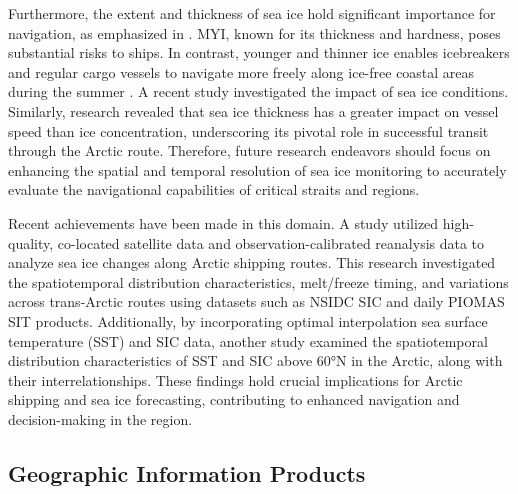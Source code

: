 Furthermore, the extent and thickness of sea ice hold significant importance for navigation, as emphasized in \cite{172buixade2014commercial}. MYI, known for its thickness and hardness, poses substantial risks to ships. In contrast, younger and thinner ice enables icebreakers and regular cargo vessels to navigate more freely along ice-free coastal areas during the summer \cite{175zhou2021revisiting}. A recent study \cite{177wang2021feasibility} investigated the impact of sea ice conditions. Similarly, research \cite{170shi2022navigability} revealed that sea ice thickness has a greater impact on vessel speed than ice concentration, underscoring its pivotal role in successful transit through the Arctic route. Therefore, future research endeavors should focus on enhancing the spatial and temporal resolution of sea ice monitoring to accurately evaluate the navigational capabilities of critical straits and regions.

Recent achievements have been made in this domain. A study \cite{173cao2022trans} utilized high-quality, co-located satellite data and observation-calibrated reanalysis data to analyze sea ice changes along Arctic shipping routes. This research investigated the spatiotemporal distribution characteristics, melt/freeze timing, and variations across trans-Arctic routes using datasets such as NSIDC SIC and daily PIOMAS SIT products. Additionally, by incorporating optimal interpolation sea surface temperature (SST) and SIC data, another study \cite{174yang2023changes} examined the spatiotemporal distribution characteristics of SST and SIC above 60°N in the Arctic, along with their interrelationships. These findings hold crucial implications for Arctic shipping and sea ice forecasting, contributing to enhanced navigation and decision-making in the region.

\subsection{Geographic Information Products}

